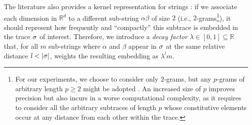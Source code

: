  The literature also provides a kernel representation for strings \cite{GartnerFW03}: if we associate each dimension in $\mathbb{R}^d$ to a different sub-string $\alpha\beta$ of size $2$ (i.e., $2$-grams\footnote{\label{fn:caveat}For our experiments, we choose to consider only $2$-grams, but any $p$-grams of arbitrary length $p\geq 2$ might be adopted \cite{Gartner03}. An increased size of $p$ improves precision but also incurs in a worse computational complexity, as it requires to consider all the arbitrary subtraces of length $p$ whose constitutive elements occur at any distance from each other within the trace.}), it should represent how frequently and ``compactly'' this subtrace is embedded in the trace $\sigma$ of interest. Therefore, we introduce a \emph{decay factor} $\lambda\in[0,1]\subseteq\mathbb{R}$ that, for all $m$ sub-strings where $\alpha$ and $\beta$ appear in $\sigma$ at the same relative distance $l < |\sigma|$, weights the resulting embedding as $\lambda^lm$.



